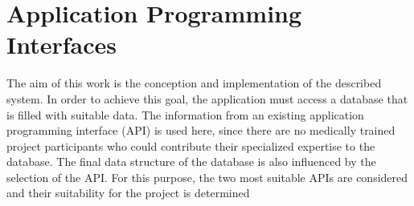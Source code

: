 
\section{Application Programming Interfaces}
The aim of this work is the conception and implementation of the described system. In order to achieve this goal, the application must access a database that is filled with suitable data. The information from an existing application programming interface (API) is used here, since there are no medically trained project participants who could contribute their specialized expertise to the database. The final data structure of the database is also influenced by the selection of the API. For this purpose, the two most suitable APIs are considered and their suitability for the project is determined

